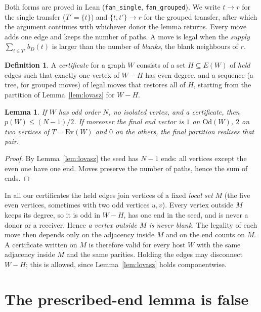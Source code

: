 \documentclass[11pt]{amsart}
\newtheorem{lemma}[theorem]{Lemma}
\theoremstyle{definition}
\newtheorem{definition}[theorem]{Definition}
\newcommand{\Ev}{\mathrm{Ev}}
\newcommand{\Od}{\mathrm{Od}}
\newcommand{\tr}{\to}
\begin{document}
Both forms are proved in Lean (\texttt{fan\_single}, \texttt{fan\_grouped}). We write
$t\tr r$ for the single transfer ($T'=\{t\}$) and $\{t,t'\}\tr r$ for the grouped transfer, after
which the argument continues with whichever donor the lemma returns. Every move adds one edge and
keeps the number of paths. A move is legal when the \emph{supply} $\sum_{t\in T'}b_D(t)$ is larger
than the number of \emph{blanks}, the blank neighbours of $r$.

\begin{definition}
A \emph{certificate} for a graph $W$ consists of a set $H\subseteq E(W)$ of \emph{held} edges such that
exactly one vertex of $W-H$ has even degree, and a sequence (a tree, for grouped moves) of legal moves
that restores all of $H$, starting from the partition of Lemma~\ref{lem:lovasz} for $W-H$.
\end{definition}

\begin{lemma}\label{lem:count}
If $W$ has odd order $N$, no isolated vertex, and a certificate, then $p(W)\le(N-1)/2$. If moreover
the final end vector is $1$ on $\Od(W)$, $2$ on two vertices of $T=\Ev(W)$ and $0$ on the others, the
final partition realises that pair.
\end{lemma}

\begin{proof}
By Lemma~\ref{lem:lovasz} the seed has $N-1$ ends: all vertices except the even one have one end.
Moves preserve the number of paths, hence the sum of ends.
\end{proof}

In all our certificates the held edges join vertices of a fixed \emph{local set} $M$ (the five even
vertices, sometimes with two odd vertices $u,v$). Every vertex outside $M$ keeps its degree, so it is
odd in $W-H$, has one end in the seed, and is never a donor or a receiver. Hence \emph{a vertex
outside $M$ is never blank}. The legality of each move then depends only on the adjacency inside $M$
and on the end counts on $M$. A certificate written on $M$ is therefore valid for every host $W$ with
the same adjacency inside $M$ and the same parities. Holding the edges may disconnect $W-H$; this is
allowed, since Lemma~\ref{lem:lovasz} holds componentwise.

\section{The prescribed-end lemma is false}\label{sec:false}
\end{document}
